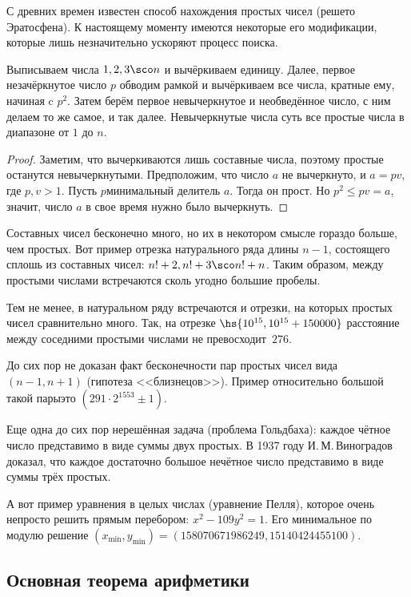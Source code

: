 \documentclass[a4paper]{article}
\begin{document}
С древних времен известен способ нахождения простых чисел (решето Эратосфена). К настоящему моменту имеются
некоторые его модификации, которые лишь незначительно ускоряют процесс поиска.

\begin{theorem}
Выписываем числа $1,2,3\sco n$ и вычёркиваем единицу. Далее, первое незачёркнутое число $p$ обводим рамкой
и вычёркиваем все числа, кратные ему, начиная c $p^2$. Затем берём первое невычеркнутое и необведённое число,
с ним делаем то  же самое, и так далее. Невычеркнутые числа суть все простые числа в диапазоне от $1$ до $n$.
\end{theorem}
\begin{proof}
Заметим, что вычеркиваются лишь составные числа, поэтому простые останутся невычеркнутыми.
Предположим, что число $a$ не вычеркнуто, и $a=pv$, где $p,v>1$. Пусть $p$\т минимальный делитель $a$.
Тогда он прост. Но $p^2 \le pv =a$, значит, число $a$ в свое время нужно было вычеркнуть.
\end{proof}

Составных чисел бесконечно много, но их в некотором смысле гораздо больше, чем простых. Вот пример отрезка
натурального ряда длины $n-1$, состоящего сплошь из составных чисел: $n!+2,n!+3\sco n!+n$. Таким образом,
между простыми числами встречаются сколь угодно большие пробелы.

Тем не менее, в натуральном ряду встречаются и отрезки, на которых простых чисел сравнительно много.
Так, на отрезке $\hs{10^{15},10^{15}+150000}$ расстояние между соседними простыми числами не превосходит~$276$.

До сих пор не доказан факт бесконечности пар простых чисел вида $(n-1,n+1)$ (гипотеза <<близнецов>>).
Пример относительно большой такой пары\т это $(291\cdot2^{1553}\pm1)$.

Еще одна до сих пор нерешённая задача (проблема Гольдбаха): каждое чётное число представимо в виде суммы двух простых. В 1937 году
И.\,М.\,Виноградов доказал, что каждое достаточно большое нечётное число представимо в виде суммы трёх простых.

А вот пример уравнения в целых числах (уравнение Пелля), которое очень непросто решить прямым перебором:
$x^2-109y^2=1$. Его минимальное по модулю решение $(x_{\min},y_{\min}) = (158070671986249, 15140424455100)$.

\subsection{Основная теорема арифметики}
\end{document}
